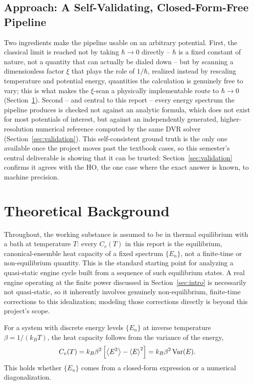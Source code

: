 \documentclass[10pt,conference]{IEEEtran}
\begin{document}
\subsection{Approach: A Self-Validating, Closed-Form-Free Pipeline}
Two ingredients make the pipeline usable on an arbitrary potential. First, the classical limit is reached not by taking $\hbar\to0$ directly -- $\hbar$ is a fixed constant of nature, not a quantity that can actually be dialed down -- but by scanning a dimensionless factor $\xi$ that plays the role of $1/\hbar$, realized instead by rescaling temperature and potential energy, quantities the calculation is genuinely free to vary; this is what makes the $\xi$-scan a physically implementable route to $\hbar\to0$ (Section~\ref{sec:theory}). Second -- and central to this report -- every energy spectrum the pipeline produces is checked not against an analytic formula, which does not exist for most potentials of interest, but against an independently generated, higher-resolution numerical reference computed by the same DVR solver (Section~\ref{sec:validation}). This self-consistent ground truth is the only one available once the project moves past the textbook cases, so this semester's central deliverable is showing that it can be trusted: Section~\ref{sec:validation} confirms it agrees with the HO, the one case where the exact answer is known, to machine precision.

\section{Theoretical Background}
\label{sec:theory}
Throughout, the working substance is assumed to be in thermal equilibrium with a bath at temperature $T$: every $C_v(T)$ in this report is the equilibrium, canonical-ensemble heat capacity of a fixed spectrum $\{E_n\}$, not a finite-time or non-equilibrium quantity. This is the standard starting point for analyzing a quasi-static engine cycle built from a sequence of such equilibrium states. A real engine operating at the finite power discussed in Section~\ref{sec:intro} is necessarily not quasi-static, so it inherently involves genuinely non-equilibrium, finite-time corrections to this idealization; modeling those corrections directly is beyond this project's scope.

For a system with discrete energy levels $\{E_n\}$ at inverse temperature $\beta=1/(k_BT)$, the heat capacity follows from the variance of the energy,
\begin{equation}
C_v(T) = k_B \beta^2 \left[\expval{E^2} - \expval{E}^2\right] = k_B\beta^2\,\mathrm{Var}(E).
\label{eq:cv_general}
\end{equation}
This holds whether $\{E_n\}$ comes from a closed-form expression or a numerical diagonalization.
\end{document}
